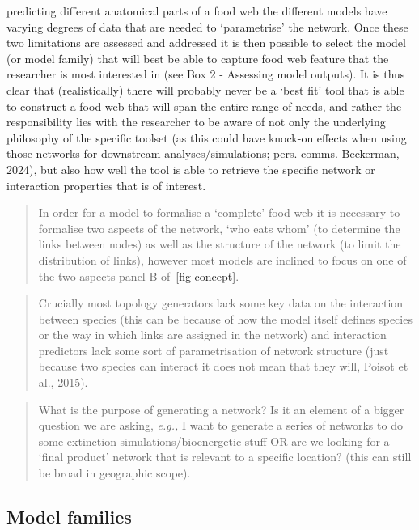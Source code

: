 \documentclass[
]{article}
\begin{document}
predicting different anatomical parts of a food web the different models
have varying degrees of data that are needed to `parametrise' the
network. Once these two limitations are assessed and addressed it is
then possible to select the model (or model family) that will best be
able to capture food web feature that the researcher is most interested
in (see Box 2 - Assessing model outputs). It is thus clear that
(realistically) there will probably never be a `best fit' tool that is
able to construct a food web that will span the entire range of needs,
and rather the responsibility lies with the researcher to be aware of
not only the underlying philosophy of the specific toolset (as this
could have knock-on effects when using those networks for downstream
analyses/simulations; pers. comms. Beckerman, 2024), but also how well
the tool is able to retrieve the specific network or interaction
properties that is of interest.

\begin{quote}
In order for a model to formalise a `complete' food web it is necessary
to formalise two aspects of the network, `who eats whom' (to determine
the links between nodes) as well as the structure of the network (to
limit the distribution of links), however most models are inclined to
focus on one of the two aspects panel B of~\ref{fig-concept}.
\end{quote}

\begin{quote}
Crucially most topology generators lack some key data on the interaction
between species (this can be because of how the model itself defines
species or the way in which links are assigned in the network) and
interaction predictors lack some sort of parametrisation of network
structure (just because two species can interact it does not mean that
they will, Poisot et al., 2015).
\end{quote}

\begin{quote}
What is the purpose of generating a network? Is it an element of a
bigger question we are asking, \emph{e.g.,} I want to generate a series
of networks to do some extinction simulations/bioenergetic stuff OR are
we looking for a `final product' network that is relevant to a specific
location? (this can still be broad in geographic scope).
\end{quote}

\subsection{Model families}\label{model-families}
\end{document}
